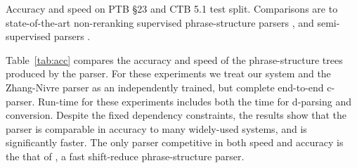 \documentclass[11pt,letterpaper]{article}
\newcommand{\ParseName}{\textsc{ParPar}\xspace}
\begin{document}
\begin{table}

  \caption{ Accuracy and speed on PTB \S 23 and CTB 5.1 test split. Comparisons are to state-of-the-art non-reranking supervised
    phrase-structure parsers
    \cite{charniak2000maximum,klein2003accurate,petrov2007improved,carreras2008tag,zhu2013fast,bikel2004parameter},
    and semi-supervised parsers \cite{charniak2005coarse,socher2013parsing}.
  \label{tab:acc}
}
\end{table}

Table~\ref{tab:acc} compares the accuracy and speed of the
phrase-structure trees produced by the parser.  For these experiments
we treat our system and the Zhang-Nivre parser as an independently
trained, but complete end-to-end c-parser. Run-time for these
experiments includes both the time for d-parsing and conversion.
Despite the fixed dependency constraints, the results show that the
parser is comparable in accuracy to many widely-used systems, and is
significantly faster. The only parser competitive in both speed and
accuracy is the that of , a fast shift-reduce
phrase-structure parser.
\end{document}
